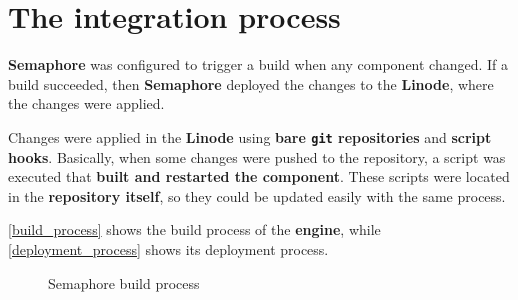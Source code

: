\documentclass[a4paper,11pt,titlepage,abstract,numbers=noenddot,automark,mnsy,intlimits,rgb,dvipsnames]{report}
\begin{document}
\section{The integration process}
\textbf{Semaphore} was configured to trigger a build when any component
changed. If a build succeeded, then \textbf{Semaphore} deployed the changes to the \textbf{Linode}, where the changes were applied.

Changes were applied in the \textbf{Linode} using \textbf{bare \texttt{git} repositories} and \textbf{script hooks}. Basically,
when some changes were pushed to the repository, a script was executed that \textbf{built and restarted the component}.
These scripts were located in the \textbf{repository itself}, so they could be updated easily with the same process.

\autoref{build_process} shows the build process of the \textbf{engine}, while \autoref{deployment_process} shows
its deployment process.
\begin{figure}[H]
\begin{center}
\noindent{}
\end{center}
\caption{Semaphore build process}
\label{build_process}
\end{figure}
\end{document}
